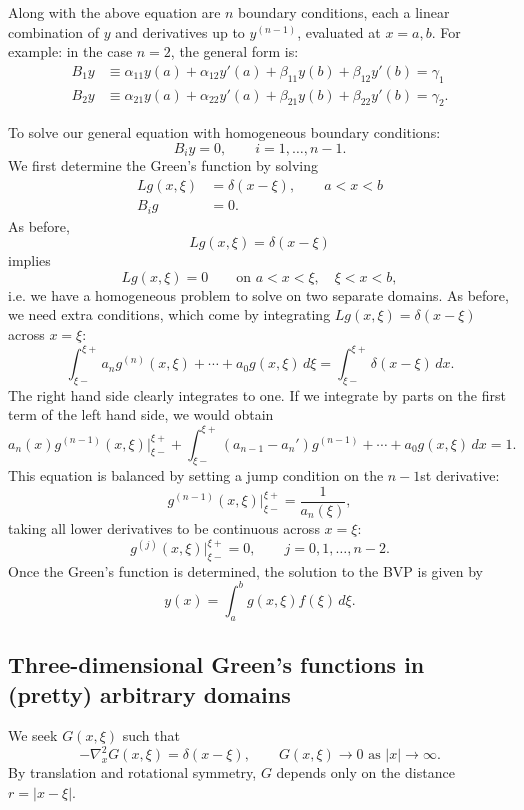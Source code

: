 \documentclass[10pt, a4paper]{article}
\begin{document}
Along with the above equation are $n$ boundary conditions,
each a linear combination of $y$ and derivatives up to $y ^ {(n - 1)}$,
evaluated at $x = a, b$.
For example:
in the case $n = 2$,
the general form is:
\begin{align*}
    B_1y &\equiv \alpha_{11}y(a) + \alpha_{12}y'(a) + \beta_{11}y(b) + \beta_{12}y'(b) = \gamma_1 \\
    B_2y &\equiv \alpha_{21}y(a) + \alpha_{22}y'(a) + \beta_{21}y(b) + \beta_{22}y'(b) = \gamma_2.
\end{align*}

To solve our general equation with homogeneous boundary conditions:
\[
B_iy = 0,\qquad i = 1,\dotsc, n - 1.
\]
We first determine the Green's function by solving
\begin{align*}
    Lg(x, \xi) &= \delta(x - \xi),\qquad a < x < b \\
    B_ig &= 0.
\end{align*}
As before,
\[
Lg(x, \xi) = \delta(x - \xi)
\]
implies
\[
Lg(x, \xi) = 0\qquad\text{on } a < x < \xi,\quad \xi < x < b,
\]
i.e.
we have a homogeneous problem to solve on two separate domains.
As before,
we need extra conditions,
which come by integrating $Lg(x, \xi) = \delta(x - \xi)$ across $x = \xi$:
\[
\int_{\xi-}^{\xi+}a_ng ^ {(n)}(x, \xi) + \dotsi + a_0g(x, \xi)\,d\xi = \int_{\xi-}^{\xi+}\delta(x - \xi)\,dx.
\]
The right hand side clearly integrates to one.
If we integrate by parts on the first term of the left hand side,
we would obtain
\[
a_n(x)g ^ {(n - 1)}(x, \xi)\biggr|_{\xi-}^{\xi+} + \int_{\xi-}^{\xi+}(a_{n - 1} - a_n')g ^ {(n - 1)} + \dotsi + a_0g(x, \xi)\,dx = 1.
\]
This equation is balanced by setting a jump condition on the $n - 1$st derivative:
\[
g ^ {(n - 1)}(x, \xi)\biggr|_{\xi-}^{\xi+} = \frac{1}{a_n(\xi)},
\]
taking all lower derivatives to be continuous across $x = \xi$:
\[
g ^ {(j)}(x, \xi)\biggr|_{\xi-}^{\xi+} = 0,\qquad j = 0, 1, \dotsc, n - 2.
\]
Once the Green's function is determined,
the solution to the BVP is given by
\[
y(x) = \int_{a}^{b}g(x, \xi)f(\xi)\,d\xi.
\]

\subsection{Three-dimensional Green's functions in
(pretty)
arbitrary domains}
We seek $G(x, \xi)$ such that
\[
-\nabla_{x}^{2}G(x, \xi) = \delta(x - \xi),\qquad G(x, \xi) \to 0\text{ as } |x| \to \infty.
\]
By translation and rotational symmetry,
$G$ depends only on the distance $r = |x - \xi|$.
\end{document}
